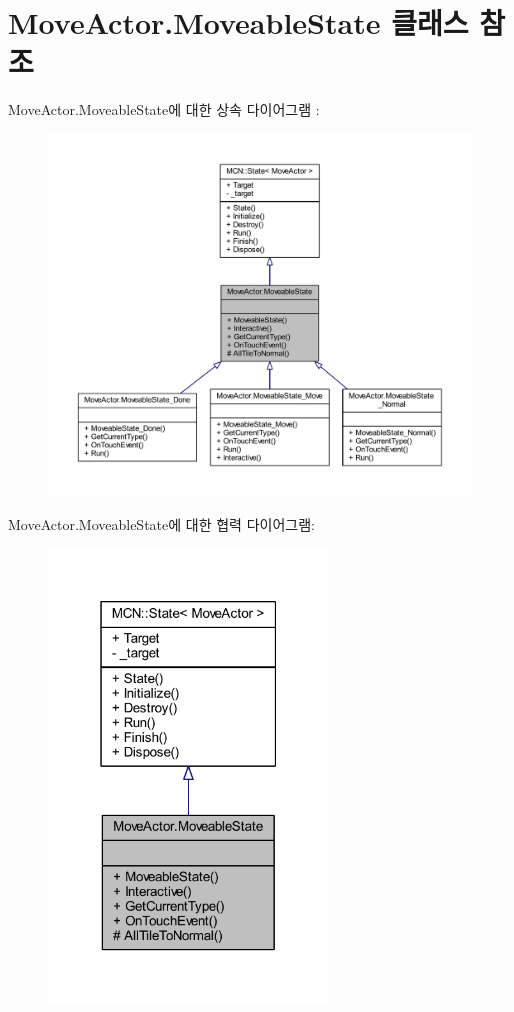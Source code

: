 \hypertarget{class_move_actor_1_1_moveable_state}{}\section{Move\+Actor.\+Moveable\+State 클래스 참조}
\label{class_move_actor_1_1_moveable_state}


Move\+Actor.\+Moveable\+State에 대한 상속 다이어그램 \+: \nopagebreak
\begin{figure}[H]
\begin{center}
\leavevmode
\includegraphics[width=350pt]{class_move_actor_1_1_moveable_state__inherit__graph}
\end{center}
\end{figure}


Move\+Actor.\+Moveable\+State에 대한 협력 다이어그램\+:\nopagebreak
\begin{figure}[H]
\begin{center}
\leavevmode
\includegraphics[width=211pt]{class_move_actor_1_1_moveable_state__coll__graph}
\end{center}
\end{figure}
